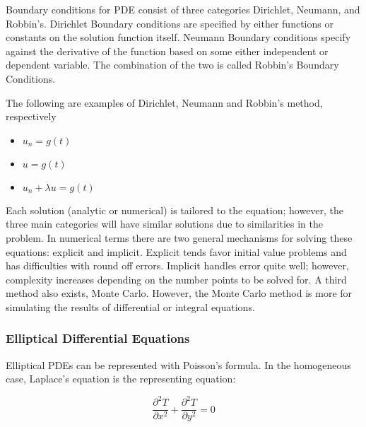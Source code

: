 Boundary conditions for PDE 
consist of three categories %
Dirichlet, Neumann, and Robbin's.  Dirichlet Boundary conditions are specified by either functions or constants on the solution function itself.  Neumann Boundary conditions specify against the derivative of the function based on some either independent or dependent variable.  The combination of the two is called Robbin's Boundary Conditions.  %

The following are examples of Dirichlet, Neumann and Robbin's method, respectively%
\begin{itemize}
\item $u_n =g(t) $
\item $u = g(t) $
\item $u_n + \lambda u = g(t)$
\end{itemize}



Each solution (analytic or numerical) is tailored to the equation; however, the three main categories will have similar solutions due to similarities in the problem. 
In numerical terms there are two general mechanisms for solving these equations: explicit and implicit.  Explicit tends favor initial value problems and has difficulties with round off errors.  Implicit handles error quite well; however, complexity %
 increases depending on the number points to be solved for.  A third method also exists, Monte Carlo.  However, the Monte Carlo method is more for simulating the results of differential or integral equations.  




\subsubsection {Elliptical Differential Equations} 
Elliptical PDEs can be represented with Poisson's formula.  In the homogeneous case, Laplace's equation is the representing equation:

\begin{equation}
\frac{\partial ^2 T} {\partial x^2} + \frac{\partial ^2 T} {\partial y^2} = 0
\end{equation}


